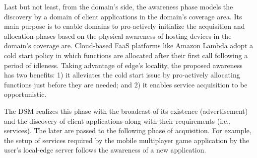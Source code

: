 
Last but not least, from the domain's side, the awareness phase models the discovery by a domain of client applications in the domain's coverage area. Its main purpose is to enable domains to pro-actively initialize the acquisition and allocation phases based on the physical awareness of hosting devices in the domain's coverage are. Cloud-based FaaS platforms like Amazon Lambda adopt a cold start policy in which functions are allocated after their first call following a period of idleness. Taking advantage of edge's locality, the proposed awareness has two benefits: 1) it alleviates the cold start issue by pro-actively allocating functions just before they are needed; and 2) it enables service acquisition to be opportunistic.


The DSM realizes this phase with the broadcast of its existence (advertisement) and the discovery of client applications along with their requirements (i.e., services). The later are passed to the following phase of acquisition.
For example, the setup of services required by the mobile multiplayer game application by the user's local-edge server follows the awareness of a new application.

